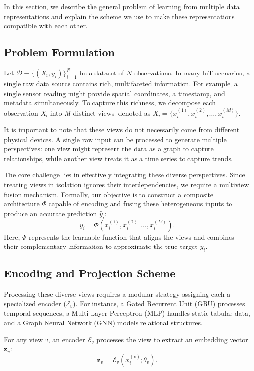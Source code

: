 \documentclass[journal]{IEEEtran}
\begin{document}
In this section, we describe the general problem of learning from multiple data representations and explain the scheme we use to make these representations compatible with each other.

\subsection{Problem Formulation}
Let $\mathcal{D} = \{(X_i, y_i)\}_{i=1}^N$ be a dataset of $N$ observations. In many IoT scenarios, a single raw data source contains rich, multifaceted information. For example, a single sensor reading might provide spatial coordinates, a timestamp, and metadata simultaneously. To capture this richness, we decompose each observation $X_i$ into $M$ distinct views, denoted as $X_i = \{x_i^{(1)}, x_i^{(2)}, \dots, x_i^{(M)}\}$.

It is important to note that these views do not necessarily come from different physical devices. A single raw input can be processed to generate multiple perspectives: one view might represent the data as a graph to capture relationships, while another view treats it as a time series to capture trends.

The core challenge lies in effectively integrating these diverse perspectives. Since treating views in isolation ignores their interdependencies, we require a multiview fusion mechanism. Formally, our objective is to construct a composite architecture $\Phi$ capable of encoding and fusing these heterogeneous inputs to produce an accurate prediction $\hat{y}_i$:
\begin{equation}
\hat{y}_i = \Phi(x_i^{(1)}, x_i^{(2)}, \dots, x_i^{(M)}).
\end{equation}
Here, $\Phi$ represents the learnable function that aligns the views and combines their complementary information to approximate the true target $y_i$.


\subsection{Encoding and Projection Scheme} \label{subsec:encoding_scheme}

Processing these diverse views requires a modular strategy assigning each a specialized encoder ($\mathcal{E}_v$). For instance, a Gated Recurrent Unit (GRU) processes temporal sequences, a Multi-Layer Perceptron (MLP) handles static tabular data, and a Graph Neural Network (GNN) models relational structures.

For any view $v$, an encoder $\mathcal{E}_v$ processes the view to extract an embedding vector $\mathbf{z}_v$:
\begin{equation}
    \mathbf{z}_v = \mathcal{E}_v(x_i^{(v)}; \theta_v).
\end{equation}
\end{document}
